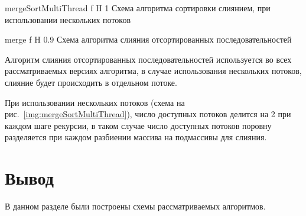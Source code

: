 {mergeSortMultiThread} %
{f} %
{H} %
{1\textwidth} %
{Схема алгоритма сортировки слиянием, при использовании нескольких потоков} %

{merge} %
{f} %
{H} %
{0.9\textwidth} %
{Схема алгоритма слияния отсортированных последовательностей} %

\newpage

Алгоритм слияния отсортированных последовательностей используется во всех рассматриваемых версиях алгоритма, в случае использования нескольких потоков, слияние будет происходить в отдельном потоке.

При использовании нескольких потоков (схема на рис.~\ref{img:mergeSortMultiThread}), число доступных потоков делится на 2 при каждом шаге рекурсии, в таком случае число доступных потоков поровну разделяется при каждом разбиении массива на подмассивы для слияния.

\section*{Вывод}
В данном разделе  были построены схемы рассматриваемых алгоритмов.

